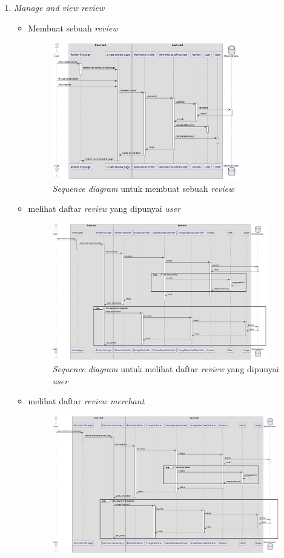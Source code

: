\documentclass[a4paper]{article}
\begin{document}
\begin{enumerate}
\begin{enumerate}
        \item \textit{Manage and view review}
        \begin{itemize}
            \item Membuat sebuah \textit{review}
            \begin{figure}[h]
                \centering
                \includegraphics*[height=6cm]{./diagram/sequence diagram/16. review/create review/create review.png}
                \caption{\textit{Sequence diagram} untuk membuat sebuah \textit{review}}
            \end{figure}
            \item melihat daftar \textit{review} yang dipunyai \textit{user}
            \begin{figure}[h]
                \centering
                \includegraphics*[height=6cm]{./diagram/sequence diagram/16. review/view user review/view user review list.png}
                \caption{\textit{Sequence diagram} untuk melihat daftar \textit{review} yang dipunyai \textit{user}}
            \end{figure}
            \newpage
            \item melihat daftar \textit{review merchant} 
            \begin{figure}[h]
                \centering
                \includegraphics*[height=6cm]{./diagram/sequence diagram/16. review/view merchant review/merchant review.png}

\end{figure}
\end{itemize}
\end{enumerate}
\end{enumerate}
\end{document}
